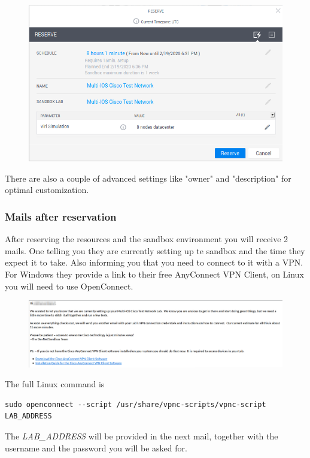 \documentclass{article}
\begin{document}
\begin{figure}[H]
	\centering
	\includegraphics[width=\textwidth]{images/Reserve_resources.png}
\end{figure}

There are also a couple of advanced settings like "owner" and "description" for optimal customization.

\subsubsection{Mails after reservation}
After reserving the resources and the sandbox environment you will receive 2 mails.
One telling you they are currently setting up te sandbox and the time they expect it to take.
Also informing you that you need to connect to it with a VPN.
For Windows they provide a link to their free AnyConnect VPN Client, on Linux you will need to use OpenConnect.

\begin{figure}[H]
	\centering
	\includegraphics[width=\textwidth]{images/First_mail.png}
\end{figure}

The full Linux command is
\begin{lstlisting}
sudo openconnect --script /usr/share/vpnc-scripts/vpnc-script LAB_ADDRESS
\end{lstlisting}
The \textit{LAB\_ADDRESS} will be provided in the next mail,
together with the username and the password you will be asked for.
\end{document}

